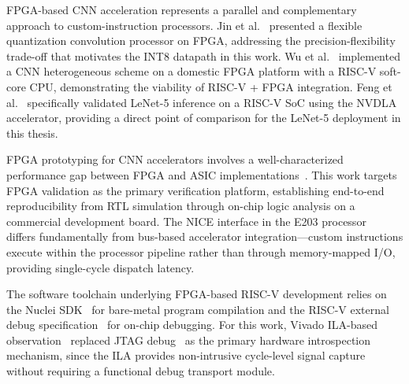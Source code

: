 FPGA-based CNN acceleration represents a parallel and complementary approach to custom-instruction processors. Jin et al.~\cite{jin2026fpga} presented a flexible quantization convolution processor on FPGA, addressing the precision-flexibility trade-off that motivates the INT8 datapath in this work. Wu et al.~\cite{wu2022domestic} implemented a CNN heterogeneous scheme on a domestic FPGA platform with a RISC-V soft-core CPU, demonstrating the viability of RISC-V + FPGA integration. Feng et al.~\cite{feng2019lenet5} specifically validated LeNet-5 inference on a RISC-V SoC using the NVDLA accelerator, providing a direct point of comparison for the LeNet-5 deployment in this thesis.

FPGA prototyping for CNN accelerators involves a well-characterized performance gap between FPGA and ASIC implementations~\cite{KUON_FPGA_GAP}. This work targets FPGA validation as the primary verification platform, establishing end-to-end reproducibility from RTL simulation through on-chip logic analysis on a commercial development board. The NICE interface in the E203 processor~\cite{NUCLEI_E203} differs fundamentally from bus-based accelerator integration---custom instructions execute within the processor pipeline rather than through memory-mapped I/O, providing single-cycle dispatch latency.

The software toolchain underlying FPGA-based RISC-V development relies on the Nuclei SDK~\cite{NUCLEI_SDK} for bare-metal program compilation and the RISC-V external debug specification~\cite{NUCLEI_E203_DEBUG} for on-chip debugging. For this work, Vivado ILA-based observation~\cite{XILINX_UG908} replaced JTAG debug~\cite{GDB_MANUAL,OPENOCD_MANUAL} as the primary hardware introspection mechanism, since the ILA provides non-intrusive cycle-level signal capture without requiring a functional debug transport module.


